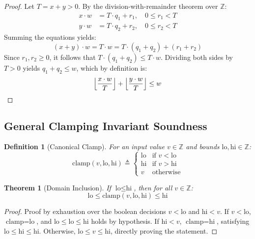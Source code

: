 \documentclass[10pt,journal,compsoc]{IEEEtran}
\newtheorem{theorem}{Theorem}
\newtheorem{definition}{Definition}
\begin{document}
\begin{proof}
Let $T = x + y > 0$. By the division-with-remainder theorem over $\mathbb{Z}$:
\begin{align}
x \cdot w &= T \cdot q_1 + r_1, \quad 0 \le r_1 < T \\
y \cdot w &= T \cdot q_2 + r_2, \quad 0 \le r_2 < T
\end{align}
Summing the equations yields:
\begin{equation}
(x + y) \cdot w = T \cdot w = T \cdot (q_1 + q_2) + (r_1 + r_2)
\end{equation}
Since $r_1, r_2 \ge 0$, it follows that $T \cdot (q_1 + q_2) \le T \cdot w$. Dividing both sides by $T > 0$ yields $q_1 + q_2 \le w$, which by definition is:
\begin{equation}
\left\lfloor \frac{x \cdot w}{T} \right\rfloor + \left\lfloor \frac{y \cdot w}{T} \right\rfloor \le w \qedhere
\end{equation}
\end{proof}

\subsection{General Clamping Invariant Soundness}

\begin{definition}[Canonical Clamp]
For an input value $v \in \mathbb{Z}$ and bounds $\text{lo}, \text{hi} \in \mathbb{Z}$:
\begin{equation}
\text{clamp}(v, \text{lo}, \text{hi}) \triangleq \begin{cases} \text{lo} & \text{if } v < \text{lo} \\ \text{hi} & \text{if } v > \text{hi} \\ v & \text{otherwise} \end{cases}
\end{equation}
\end{definition}

\begin{theorem}[Domain Inclusion]
If $\text{lo} \le \text{hi}$, then for all $v \in \mathbb{Z}$:
\begin{equation}
\text{lo} \le \text{clamp}(v, \text{lo}, \text{hi}) \le \text{hi}
\end{equation}
\end{theorem}

\begin{proof}
Proof by exhaustion over the boolean decisions $v < \text{lo}$ and $\text{hi} < v$. If $v < \text{lo}$, $\text{clamp} = \text{lo}$, and $\text{lo} \le \text{lo} \le \text{hi}$ holds by hypothesis. If $\text{hi} < v$, $\text{clamp} = \text{hi}$, satisfying $\text{lo} \le \text{hi} \le \text{hi}$. Otherwise, $\text{lo} \le v \le \text{hi}$, directly proving the statement.
\end{proof}
\end{document}

